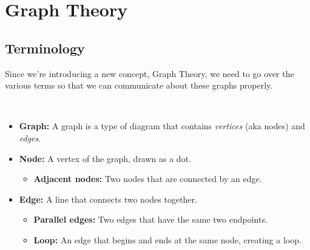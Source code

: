 \documentclass[a4paper,12pt]{book}
\title{}
\author{Rachel Morris}
\date{\today}
\begin{document}
    \togglefalse{answerkey}

    \section{Graph Theory}

    \subsection{Terminology}

        Since we're introducing a new concept, Graph Theory,
        we need to go over the various terms so that we
        can communicate about these graphs properly.

        \begin{intro}{\ }
            \begin{itemize}
                \item   \textbf{Graph:} A graph is a type of diagram that contains \textit{vertices} (aka nodes) and \textit{edges}.

                \begin{center}
                \end{center}

                \item   \textbf{Node:} A vertex of the graph, drawn as a dot.
                    \begin{itemize}
                        \item   \textbf{Adjacent nodes:} Two nodes that are connected by an edge.
                    \end{itemize}

                \item   \textbf{Edge:} A line that connects two nodes together.
                    \begin{itemize}
                        \item   \textbf{Parallel edges:} Two edges that have
                            the same two endpoints.
                        \item   \textbf{Loop:} An edge that begins and ends at
                            the same node, creating a loop.
                    \end{itemize}


\end{itemize}
\end{intro}
\end{document}

